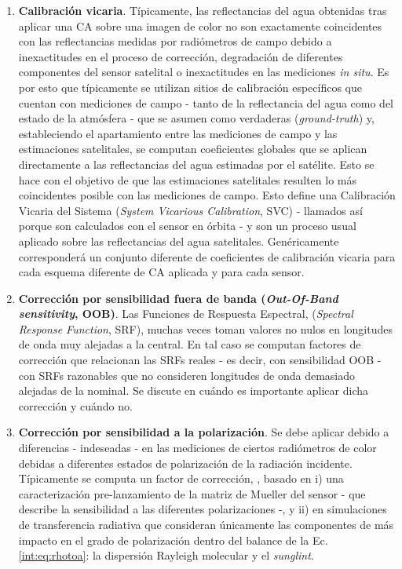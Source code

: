     \begin{enumerate}
        \item \textbf{Calibración vicaria}. Típicamente, las reflectancias del agua obtenidas tras aplicar una CA sobre una imagen de color no son exactamente coincidentes con las reflectancias medidas por radiómetros de campo debido a inexactitudes en el proceso de corrección, degradación de diferentes componentes del sensor satelital o inexactitudes en las mediciones \textit{in situ}. Es por esto que típicamente se utilizan sitios de calibración específicos que cuentan con mediciones de campo - tanto de la reflectancia del agua como del estado de la atmósfera - que se asumen como verdaderas (\textit{ground-truth}) y, estableciendo el apartamiento entre las mediciones de campo y las estimaciones satelitales, se computan coeficientes globales que se aplican directamente a las reflectancias del agua estimadas por el satélite. Esto se hace con el objetivo de que las estimaciones satelitales resulten lo más coincidentes posible con las mediciones de campo. Esto define una Calibración Vicaria del Sistema (\textit{System Vicarious Calibration}, SVC) - llamados así porque son calculados con el sensor en órbita - y son un proceso usual aplicado sobre las reflectancias del agua satelitales. Genéricamente corresponderá un conjunto diferente de coeficientes de calibración vicaria para cada esquema diferente de CA aplicada y para cada sensor.
        \item \textbf{Corrección por sensibilidad fuera de banda (\textit{Out-Of-Band sensitivity}, OOB)}. Las Funciones de Respuesta Espectral, (\textit{Spectral Response Function}, SRF), muchas veces toman valores no nulos en longitudes de onda muy alejadas a la central. En tal caso se computan factores de corrección que relacionan las SRFs reales - es decir, con sensibilidad OOB - con SRFs razonables que no consideren longitudes de onda demasiado alejadas de la nominal. Se discute en \cite{mobley2016} cuándo es importante aplicar dicha corrección y cuándo no.
        \item \textbf{Corrección por sensibilidad a la polarización}. Se debe aplicar debido a diferencias - indeseadas - en las mediciones de ciertos radiómetros de color debidas a diferentes estados de polarización de la radiación incidente. Típicamente se computa un factor de corrección, \cite{mobley2016}, basado en i) una caracterización pre-lanzamiento de la matriz de Mueller del sensor - que describe la sensibilidad a las diferentes polarizaciones -, y ii) en simulaciones de transferencia radiativa que consideran únicamente las componentes de más impacto en el grado de polarización dentro del balance de la Ec. \ref{int:eq:rhotoa}: la dispersión Rayleigh molecular y el \textit{sunglint}.
    \end{enumerate}

